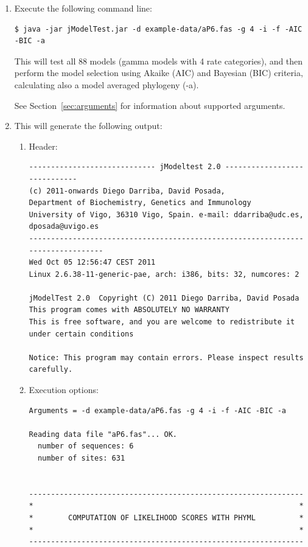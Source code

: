 \begin{enumerate}
\item Execute the following command line:
\begin{lstlisting}
$ java -jar jModelTest.jar -d example-data/aP6.fas -g 4 -i -f -AIC -BIC -a
\end{lstlisting}

This will test all 88 models (gamma models with 4 rate categories), and then perform the model selection using Akaike (AIC) and Bayesian (BIC) criteria, calculating also a model averaged phylogeny (-a).

See Section~\ref{sec:arguments} for information about supported arguments.

\item This will generate the following output:

\begin{enumerate}

\item Header:

\begin{lstlisting}
----------------------------- jModeltest 2.0 -----------------------------
(c) 2011-onwards Diego Darriba, David Posada,
Department of Biochemistry, Genetics and Immunology
University of Vigo, 36310 Vigo, Spain. e-mail: ddarriba@udc.es, dposada@uvigo.es
--------------------------------------------------------------------------------
Wed Oct 05 12:56:47 CEST 2011
Linux 2.6.38-11-generic-pae, arch: i386, bits: 32, numcores: 2

jModelTest 2.0  Copyright (C) 2011 Diego Darriba, David Posada
This program comes with ABSOLUTELY NO WARRANTY
This is free software, and you are welcome to redistribute it
under certain conditions
 
Notice: This program may contain errors. Please inspect results carefully.
\end{lstlisting}

\item Execution options:

\begin{lstlisting} 
Arguments = -d example-data/aP6.fas -g 4 -i -f -AIC -BIC -a

Reading data file "aP6.fas"... OK.
  number of sequences: 6
  number of sites: 631
 
 
---------------------------------------------------------------
*                                                             *
*        COMPUTATION OF LIKELIHOOD SCORES WITH PHYML          *
*                                                             *
---------------------------------------------------------------
 

\end{lstlisting}
\end{enumerate}
\end{enumerate}

